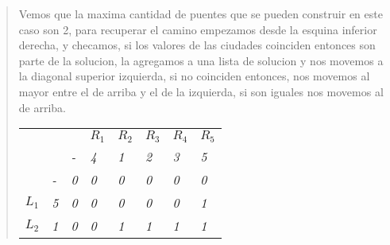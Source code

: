 \begin{quote}
    Vemos que la maxima cantidad de puentes que se pueden construir en este caso son 2, para recuperar el camino empezamos desde la esquina inferior derecha, y checamos, si los valores de las ciudades coinciden entonces son parte de la solucion, la agregamos a una lista de solucion y nos movemos a la diagonal superior izquierda, si no coinciden entonces, nos movemos al mayor entre el de arriba y el de la izquierda, si son iguales nos movemos al de arriba. \vspace{.2cm}
    
    \begin{table}[H]
        \centering
        \begin{tabular}{llllllll}
            \textit{}      & \textit{}                       & \textit{}                                               & \textit{$R_1$}                                          & \textit{$R_2$}                                          & \textit{$R_3$}                                          & \textit{$R_4$}                                          & \textit{$R_5$}                                          \\
            \textit{}      & \textit{}                       & \textit{-}                                              & \textit{4}                                              & \textit{1}                                              & \textit{2}                                              & \textit{3}                                              & \textit{5}                                              \\ \cline{3-8} 
            \textit{}      & \multicolumn{1}{l|}{\textit{-}} & \multicolumn{1}{l|}{\cellcolor[HTML]{FFFFFF}\textit{0}} & \multicolumn{1}{l|}{\cellcolor[HTML]{FFFFFF}\textit{0}} & \multicolumn{1}{l|}{\textit{0}}                         & \multicolumn{1}{l|}{\textit{0}}                         & \multicolumn{1}{l|}{\textit{0}}                         & \multicolumn{1}{l|}{\textit{0}}                         \\ \cline{3-8} 
            \textit{$L_1$} & \multicolumn{1}{l|}{\textit{5}} & \multicolumn{1}{l|}{\textit{0}}                         & \multicolumn{1}{l|}{\cellcolor[HTML]{FFFC9E}\textit{0}} & \multicolumn{1}{l|}{\textit{0}}                         & \multicolumn{1}{l|}{\textit{0}}                         & \multicolumn{1}{l|}{\textit{0}}                         & \multicolumn{1}{l|}{\textit{1}}                         \\ \cline{3-8} 
            \textit{$L_2$} & \multicolumn{1}{l|}{\textit{1}} & \multicolumn{1}{l|}{\textit{0}}                         & \multicolumn{1}{l|}{\textit{0}}                         & \multicolumn{1}{l|}{\cellcolor[HTML]{FFFC9E}\textit{1}} & \multicolumn{1}{l|}{\cellcolor[HTML]{FFFC9E}\textit{1}} & \multicolumn{1}{l|}{\textit{1}}                         & \multicolumn{1}{l|}{\textit{1}}                         \\ \cline{3-8} 

\end{tabular}
\end{table}
\end{quote}
